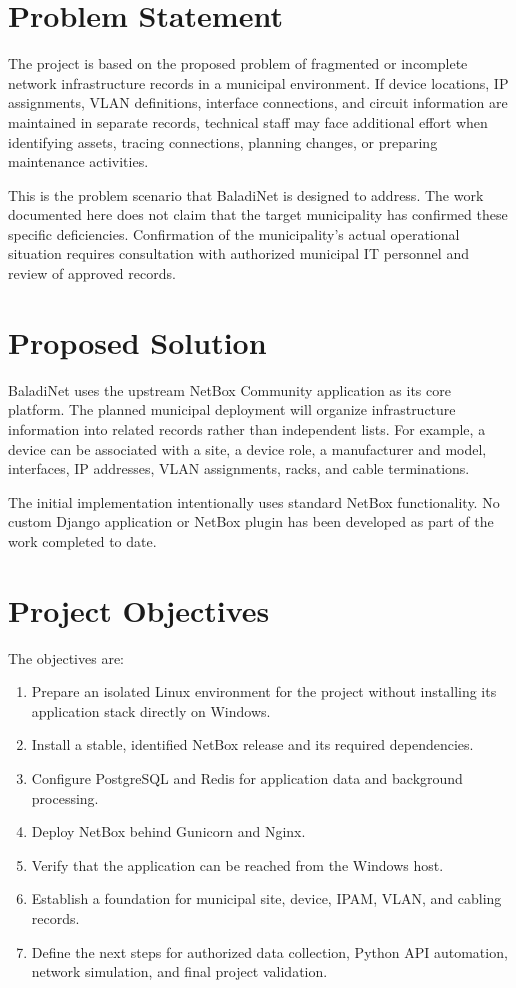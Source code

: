 \documentclass[11pt,a4paper,oneside]{report}
\begin{document}
\section{Problem Statement}
The project is based on the proposed problem of fragmented or incomplete network infrastructure records in a municipal environment. If device locations, IP assignments, VLAN definitions, interface connections, and circuit information are maintained in separate records, technical staff may face additional effort when identifying assets, tracing connections, planning changes, or preparing maintenance activities.

This is the problem scenario that BaladiNet is designed to address. The work documented here does not claim that the target municipality has confirmed these specific deficiencies. Confirmation of the municipality's actual operational situation requires consultation with authorized municipal IT personnel and review of approved records.

\section{Proposed Solution}
BaladiNet uses the upstream NetBox Community application as its core platform. The planned municipal deployment will organize infrastructure information into related records rather than independent lists. For example, a device can be associated with a site, a device role, a manufacturer and model, interfaces, IP addresses, VLAN assignments, racks, and cable terminations.

The initial implementation intentionally uses standard NetBox functionality. No custom Django application or NetBox plugin has been developed as part of the work completed to date.

\section{Project Objectives}
The objectives are:
\begin{enumerate}
  \item Prepare an isolated Linux environment for the project without installing its application stack directly on Windows.
  \item Install a stable, identified NetBox release and its required dependencies.
  \item Configure PostgreSQL and Redis for application data and background processing.
  \item Deploy NetBox behind Gunicorn and Nginx.
  \item Verify that the application can be reached from the Windows host.
  \item Establish a foundation for municipal site, device, IPAM, VLAN, and cabling records.
  \item Define the next steps for authorized data collection, Python API automation, network simulation, and final project validation.
\end{enumerate}
\end{document}
